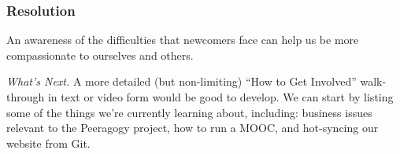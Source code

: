 \subsubsection*{Resolution}
An awareness of the difficulties that newcomers face can
help us be more compassionate to ourselves and others.

\begin{framed}
\emph{What's Next.}
A more detailed (but non-limiting) ``How to Get Involved'' walk-through in text or video form would be good to develop. We can start by listing some of the things we're currently learning about, including: business issues relevant to the Peeragogy project, how to run a MOOC, and hot-syncing our website from Git.
\end{framed}



